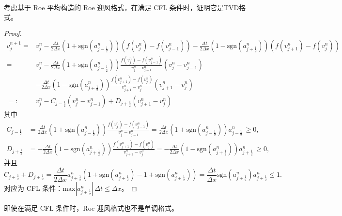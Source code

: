 \begin{example}
    考虑基于 Roe 平均构造的 Roe 迎风格式，在满足 CFL 条件时，证明它是TVD格式。
\end{example}

\begin{proof}
    {\small
        \begin{align*}
            v_j^{n+1} ={} & v_j^n - \frac{\Delta t}{2\Delta x}
            (1+\text{sgn}(a_{j-\frac12}^n))(f(v_{j}^n)-f(v_{j-1}^n))
            - \frac{\Delta t}{2\Delta x} (1-\text{sgn}(a_{j+\frac12}^n))(f(v_{j+1}^n)-f(v_{j}^n))                                                            \\
            ={}           & v_j^n - \frac{\Delta t}{2\Delta x}
            (1+\text{sgn}(a_{j-\frac12}^n))\frac{f(v_{j}^n)-f(v_{j-1}^n)}{v_{j}^n-v_{j-1}^n}(v_{j}^n-v_{j-1}^n)                                              \\
                          & - \frac{\Delta t}{2\Delta x} (1-\text{sgn}(a_{j+\frac12}^n))\frac{f(v_{j+1}^n)-f(v_{j}^n)}{v_{j+1}^n-v_{j}^n}(v_{j+1}^n-v_{j}^n) \\
            =:{}          & v_j^n - C_{j-\frac12}(v_j^n - v_{j-1}^n) + D_{j+\frac12}(v_{j+1}^n - v_j^n)
        \end{align*}}
    其中
    \begin{align*}
        C_{j-\frac12} & = \frac{\Delta t}{2\Delta x}
        (1+\text{sgn}(a_{j-\frac12}^n))\frac{f(v_{j}^n)-f(v_{j-1}^n)}{v_{j}^n-v_{j-1}^n}
        = \frac{\Delta t}{2\Delta x}
        (1+\text{sgn}(a_{j-\frac12}^n)) a_{j-\frac12}^n \,\ge 0 , \\
        D_{j+\frac12} & = - \frac{\Delta t}{2\Delta x}
        (1-\text{sgn}(a_{j+\frac12}^n))\frac{f(v_{j+1}^n)-f(v_{j}^n)}{v_{j+1}^n-v_{j}^n}
        = -\frac{\Delta t}{2\Delta x}
        (1-\text{sgn}(a_{j+\frac12}^n)) a_{j+\frac12}^n \,\ge 0 ,
    \end{align*}
    并且
    \[
        C_{j+\frac12} + D_{j+\frac12}
        ={}  \frac{\Delta t}{2\Delta x} a_{j+\frac12}^n
        (1+\text{sgn}(a_{j+\frac12}^n)-1+\text{sgn}(a_{j+\frac12}^n))
        ={} \frac{\Delta t}{\Delta x}
        \text{sgn}(a_{j+\frac12}^n)  a_{j+\frac12}^n \le 1.
    \]
    对应为 CFL 条件：$\text{max}|a_{j+\frac12}^n| \, \Delta t \le \Delta x$。
\end{proof}

\begin{remark}
    即使在满足 CFL 条件时，Roe 迎风格式也不是单调格式。
\end{remark}


